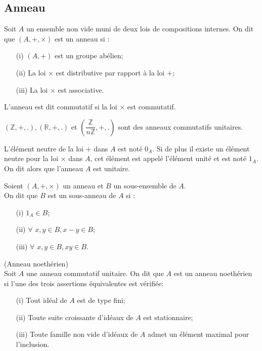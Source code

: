 \subsection{Anneau}
\begin{madefinition}
	Soit $A$ un ensemble non vide muni de deux lois de compositions internes. On dit que $(A, +, \times)$ est un anneau si :
	\begin{enumerate}
		\item[(i)] $(A,+)$ est un groupe abélien;
		\item[(ii)] La loi $\times$ est distributive par rapport à la loi $+$;
		\item[(iii)] La loi $\times$ est associative.
	\end{enumerate}
	L'anneau est dit commutatif si la loi $\times$ est commutatif.
\end{madefinition}
\begin{monexemple}
	$(\mathbb{Z}, +, .), (\mathbb{R}, +, .)$ et $(\dfrac{\mathbb{Z}}{n\mathbb{Z}}, +,.)$ sont des anneaux commutatifs unitaires.
\end{monexemple}
\begin{maremarque}
	L'élément neutre de la loi $+$ dans $A$ est noté $0_A$. Si de plus il existe un élément neutre pour la loi $\times$ dans $A$, cet élément est appelé l'élément unité et est noté $1_A$. On dit alors que l'anneau $A$ est unitaire.
\end{maremarque}
\begin{madefinition}
	Soient $(A, + , \times)$ un anneau et $B$ un sous-ensemble de $A$.\\ On dit que $B$ est un sous-anneau de $A$ si :
	\begin{enumerate}
		\item[(i)] $1_A \in B$;
		\item[(ii)] $\forall$ $x, y \in B, x-y \in B$;
		\item[(iii)] $\forall$ $x, y \in B, xy \in B$.
	\end{enumerate}
\end{madefinition}
\begin{madefinition_proposition}
	(Anneau noethérien)\\
	Soit $A$ une anneau commutatif unitaire. On dit que $A$ est un anneau noethérien si l'une des trois assertions équivalentes est vérifiée:
	\begin{enumerate}
		\item[(i)] Tout idéal de $A$ est de type fini;
		\item[(ii)] Toute suite croissante d'idéaux de $A$ est stationnaire;
		\item[(iii)] Toute famille non vide d'idéaux de $A$ admet un élément maximal pour l'inclusion.
	\end{enumerate} 
\end{madefinition_proposition}
